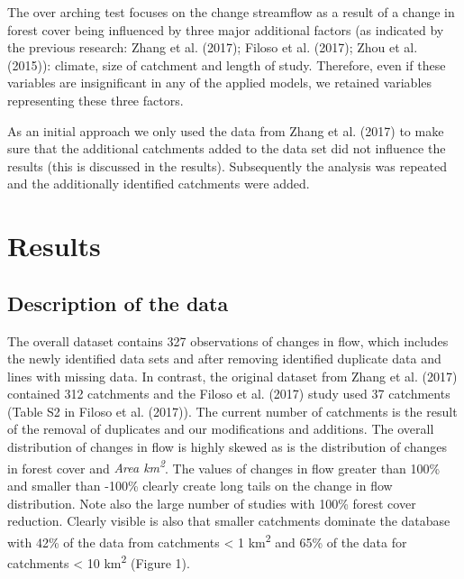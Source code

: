 \documentclass[]{elsarticle} %
\begin{document}
The over arching test focuses on the change streamflow as a result of a change in forest cover being influenced by three major additional factors (as indicated by the previous research: Zhang et al. (2017); Filoso et al. (2017); Zhou et al. (2015)): climate, size of catchment and length of study. Therefore, even if these variables are insignificant in any of the applied models, we retained variables representing these three factors.

As an initial approach we only used the data from Zhang et al. (2017) to make sure that the additional catchments added to the data set did not influence the results (this is discussed in the results). Subsequently the analysis was repeated and the additionally identified catchments were added.

\hypertarget{results}{%
\section{Results}\label{results}}

\hypertarget{description-of-the-data}{%
\subsection{Description of the data}\label{description-of-the-data}}

The overall dataset contains 327 observations of changes in flow, which includes the newly identified data sets and after removing identified duplicate data and lines with missing data. In contrast, the original dataset from Zhang et al. (2017) contained 312 catchments and the Filoso et al. (2017) study used 37 catchments (Table S2 in Filoso et al. (2017)). The current number of catchments is the result of the removal of duplicates and our modifications and additions. The overall distribution of changes in flow is highly skewed as is the distribution of changes in forest cover and \emph{Area km\textsuperscript{2}}. The values of changes in flow greater than 100\% and smaller than -100\% clearly create long tails on the change in flow distribution. Note also the large number of studies with 100\% forest cover reduction. Clearly visible is also that smaller catchments dominate the database with 42\% of the data from catchments \textless{} 1 km\textsuperscript{2} and 65\% of the data for catchments \textless{} 10 km\textsuperscript{2} (Figure 1).
\end{document}
